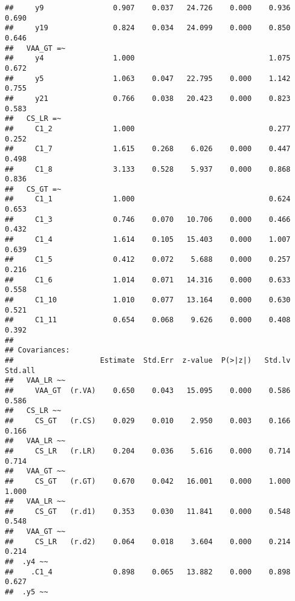 \documentclass[
]{article}
\begin{document}
\begin{verbatim}
##     y9                0.907    0.037   24.726    0.000    0.936    0.690
##     y19               0.824    0.034   24.099    0.000    0.850    0.646
##   VAA_GT =~                                                             
##     y4                1.000                               1.075    0.672
##     y5                1.063    0.047   22.795    0.000    1.142    0.755
##     y21               0.766    0.038   20.423    0.000    0.823    0.583
##   CS_LR =~                                                              
##     C1_2              1.000                               0.277    0.252
##     C1_7              1.615    0.268    6.026    0.000    0.447    0.498
##     C1_8              3.133    0.528    5.937    0.000    0.868    0.836
##   CS_GT =~                                                              
##     C1_1              1.000                               0.624    0.653
##     C1_3              0.746    0.070   10.706    0.000    0.466    0.432
##     C1_4              1.614    0.105   15.403    0.000    1.007    0.639
##     C1_5              0.412    0.072    5.688    0.000    0.257    0.216
##     C1_6              1.014    0.071   14.316    0.000    0.633    0.558
##     C1_10             1.010    0.077   13.164    0.000    0.630    0.521
##     C1_11             0.654    0.068    9.626    0.000    0.408    0.392
## 
## Covariances:
##                    Estimate  Std.Err  z-value  P(>|z|)   Std.lv  Std.all
##   VAA_LR ~~                                                             
##     VAA_GT  (r.VA)    0.650    0.043   15.095    0.000    0.586    0.586
##   CS_LR ~~                                                              
##     CS_GT   (r.CS)    0.029    0.010    2.950    0.003    0.166    0.166
##   VAA_LR ~~                                                             
##     CS_LR   (r.LR)    0.204    0.036    5.616    0.000    0.714    0.714
##   VAA_GT ~~                                                             
##     CS_GT   (r.GT)    0.670    0.042   16.001    0.000    1.000    1.000
##   VAA_LR ~~                                                             
##     CS_GT   (r.d1)    0.353    0.030   11.841    0.000    0.548    0.548
##   VAA_GT ~~                                                             
##     CS_LR   (r.d2)    0.064    0.018    3.604    0.000    0.214    0.214
##  .y4 ~~                                                                 
##    .C1_4              0.898    0.065   13.882    0.000    0.898    0.627
##  .y5 ~~                                                                 

\end{verbatim}
\end{document}
